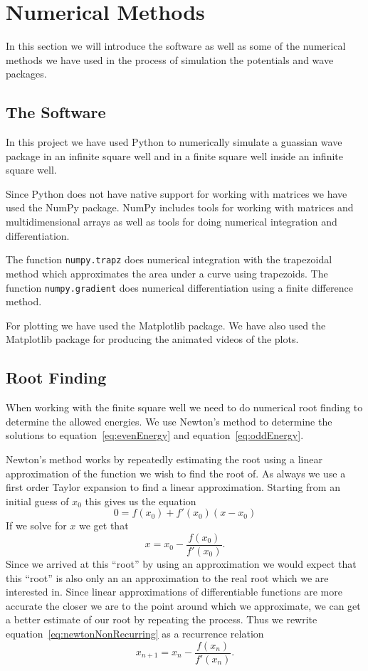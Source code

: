 \documentclass[12pt,a4paper]{article}
\begin{document}
\section{Numerical Methods}
In this section we will introduce the software as well as some of the numerical methods we have used in the process of simulation the potentials and wave packages.

\subsection{The Software}
In this project we have used Python to numerically simulate a guassian wave package in an infinite square well and in a finite square well inside an infinite square well.

Since Python does not have native support for working with matrices we have used the NumPy package. NumPy includes tools for working with matrices and multidimensional arrays as well as tools for doing numerical integration and differentiation.

The function \lstinline{numpy.trapz} does numerical integration with the trapezoidal method which approximates the area under a curve using trapezoids. The function \lstinline{numpy.gradient} does numerical differentiation using a finite difference method.

For plotting we have used the Matplotlib package. We have also used the Matplotlib package for producing the animated videos of the plots.

\subsection{Root Finding}
When working with the finite square well we need to do numerical root finding to determine the allowed energies. We use Newton's method to determine the solutions to equation~\eqref{eq:evenEnergy} and equation~\eqref{eq:oddEnergy}.

Newton's method works by repeatedly estimating the root using a linear approximation of the function we wish to find the root of. As always we use a first order Taylor expansion to find a linear approximation. Starting from an initial guess of $x_0$ this gives us the equation
\begin{equation}
0 = f(x_0) + f'(x_0)(x - x_0)
\end{equation}
If we solve for $x$ we get that
\begin{equation}
x = x_0 - \frac{f(x_0)}{f'(x_0)}. \label{eq:newtonNonRecurring}
\end{equation}
Since we arrived at this ``root'' by using an approximation we would expect that this ``root'' is also only an an approximation to the real root which we are interested in. Since linear approximations of differentiable functions are more accurate the closer we are to the point around which we approximate, we can get a better estimate of our root by repeating the process. Thus we rewrite equation~\eqref{eq:newtonNonRecurring} as a recurrence relation
\begin{equation}
x_{n+1} = x_n - \frac{f(x_n)}{f'(x_n)}.
\end{equation}
\end{document}
